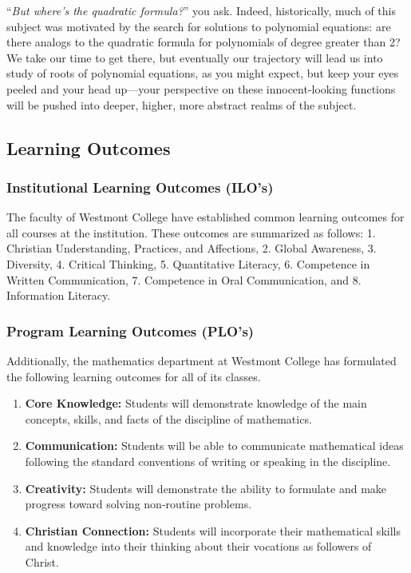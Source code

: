 \documentclass[
  twoside]{article}
\providecommand{\tightlist}{%
  \setlength{\itemsep}{0pt}\setlength{\parskip}{0pt}}
\begin{document}
``\emph{But where's the quadratic formula?}'' you ask. Indeed,
historically, much of this subject was motivated by the search for
solutions to polynomial equations: are there analogs to the quadratic
formula for polynomials of degree greater than 2? We take our time to
get there, but eventually our trajectory will lead us into study of
roots of polynomial equations, as you might expect, but keep your eyes
peeled and your head up---your perspective on these innocent-looking
functions will be pushed into deeper, higher, more abstract realms of
the subject.

\subsection{Learning Outcomes}\label{learning-outcomes}

\subsubsection{Institutional Learning Outcomes
(ILO's)}\label{institutional-learning-outcomes-ilos}

The faculty of Westmont College have established common learning
outcomes for all courses at the institution. These outcomes are
summarized as follows: 1. Christian Understanding, Practices, and
Affections, 2. Global Awareness, 3. Diversity, 4. Critical Thinking, 5.
Quantitative Literacy, 6. Competence in Written Communication, 7.
Competence in Oral Communication, and 8. Information Literacy.

\subsubsection{Program Learning Outcomes
(PLO's)}\label{program-learning-outcomes-plos}

Additionally, the mathematics department at Westmont College has
formulated the following learning outcomes for all of its classes.

\begin{enumerate}
\def\labelenumi{\arabic{enumi}.}
\tightlist
\item
  \textbf{Core Knowledge:} Students will demonstrate knowledge of the
  main concepts, skills, and facts of the discipline of mathematics.
\item
  \textbf{Communication:} Students will be able to communicate
  mathematical ideas following the standard conventions of writing or
  speaking in the discipline.
\item
  \textbf{Creativity:} Students will demonstrate the ability to
  formulate and make progress toward solving non-routine problems.
\item
  \textbf{Christian Connection:} Students will incorporate their
  mathematical skills and knowledge into their thinking about their
  vocations as followers of Christ.
\end{enumerate}
\end{document}
